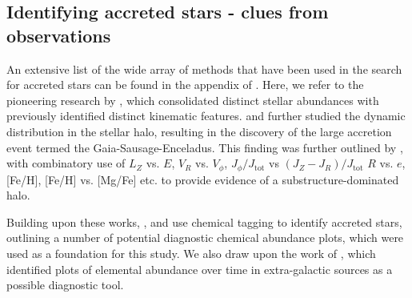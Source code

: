 \documentclass[fleqn,usenatbib]{mnras}
\begin{document}
\subsection{Identifying accreted stars - clues from observations}


An extensive list of the wide array of methods that have been used in the search for accreted stars can be found in the appendix of \citet{Buder2022}. Here, we refer to the pioneering research by \citet{Nissen2010}, which consolidated distinct stellar abundances with previously identified distinct kinematic features. \citet{Belokurov2018} and \citet{Helmi2018} further studied the dynamic distribution in the stellar halo, resulting in the discovery of the large accretion event termed the Gaia-Sausage-Enceladus. This finding was further outlined by \citet{Naidu2020}, with combinatory use of $L_Z$ vs. $E$, $V_R$ vs. $V_\phi$, $J_\phi/J_\text{tot}$ vs $(J_Z - J_R)/J_\text{tot}$ $R$ vs. $e$, [Fe/H], [Fe/H] vs. [Mg/Fe] etc. to provide evidence of a substructure-dominated halo. \par
Building upon these works, \citet{Hawkins2015}, \citet{Das2020} and \citet{Buder2022} use chemical tagging to identify accreted stars, outlining a number of potential diagnostic chemical abundance plots, which were used as a foundation for this study. We also draw upon the work of \citet{Martig2021}, which identified plots of elemental abundance over time in extra-galactic sources as a possible diagnostic tool. \par 
\end{document}
